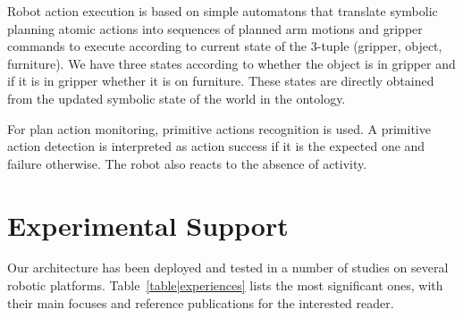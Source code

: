 \documentclass[preprint,3p,times]{elsarticle}
\begin{document}
Robot action execution is based on simple automatons  that translate
symbolic planning atomic actions into sequences of planned arm motions
and gripper commands to execute according to current state
of the 3-tuple (gripper, object, furniture). We have three states
according to whether the object is in gripper and if it is in gripper
whether it is on furniture.  These states are directly obtained from
the updated symbolic state of the world in the ontology.

For plan action monitoring, primitive actions recognition is used. A primitive
action detection is interpreted as action success if it is the expected one and
failure otherwise. The robot also reacts to the absence of activity.




\section{Experimental Support}
\label{sec:expe}

Our architecture has been deployed and tested in a number of studies on
several robotic platforms. Table~\ref{table|experiences} lists the most
significant ones, with their main focuses and reference publications for the
interested reader.
\end{document}
